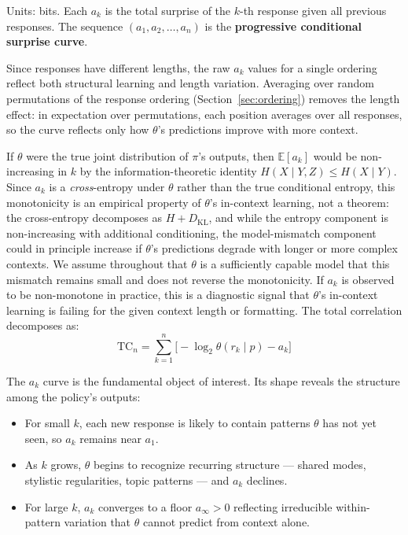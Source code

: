\documentclass[11pt]{article}
\newcommand{\E}{\mathbb{E}}
\newcommand{\KL}{D_{\mathrm{KL}}}
\newcommand{\TC}{\mathrm{TC}}
\begin{document}
Units: bits. Each $a_k$ is the total surprise of the $k$-th response given all previous responses. The sequence $(a_1, a_2, \ldots, a_n)$ is the \textbf{progressive conditional surprise curve}.

Since responses have different lengths, the raw $a_k$ values for a single ordering reflect both structural learning and length variation. Averaging over random permutations of the response ordering (Section~\ref{sec:ordering}) removes the length effect: in expectation over permutations, each position averages over all responses, so the curve reflects only how $\theta$'s predictions improve with more context.

If $\theta$ were the true joint distribution of $\pi$'s outputs, then $\E[a_k]$ would be non-increasing in $k$ by the information-theoretic identity $H(X \mid Y, Z) \leq H(X \mid Y)$. Since $a_k$ is a \emph{cross}-entropy under $\theta$ rather than the true conditional entropy, this monotonicity is an empirical property of $\theta$'s in-context learning, not a theorem: the cross-entropy decomposes as $H + \KL$, and while the entropy component is non-increasing with additional conditioning, the model-mismatch component could in principle increase if $\theta$'s predictions degrade with longer or more complex contexts. We assume throughout that $\theta$ is a sufficiently capable model that this mismatch remains small and does not reverse the monotonicity. If $a_k$ is observed to be non-monotone in practice, this is a diagnostic signal that $\theta$'s in-context learning is failing for the given context length or formatting. The total correlation decomposes as:
\begin{equation}
    \TC_n = \sum_{k=1}^{n}\bigl[-\log_2 \theta(r_k \mid p) - a_k\bigr]
\end{equation}

The $a_k$ curve is the fundamental object of interest. Its shape reveals the structure among the policy's outputs:
\begin{itemize}[nosep]
    \item For small $k$, each new response is likely to contain patterns $\theta$ has not yet seen, so $a_k$ remains near $a_1$.
    \item As $k$ grows, $\theta$ begins to recognize recurring structure --- shared modes, stylistic regularities, topic patterns --- and $a_k$ declines.
    \item For large $k$, $a_k$ converges to a floor $a_\infty > 0$ reflecting irreducible within-pattern variation that $\theta$ cannot predict from context alone.
\end{itemize}
\end{document}
